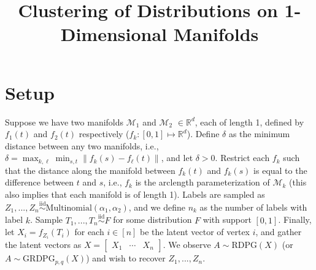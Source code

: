 \documentclass[
  11pt,
]{article}
\title{Clustering of Distributions on 1-Dimensional Manifolds}
\author{}
\date{\vspace{-2.5em}}
\begin{document}
\maketitle

\newcommand{\diag}{\mathrm{diag}}
\newcommand{\tr}{\mathrm{Tr}}
\newcommand{\blockdiag}{\mathrm{blockdiag}}
\newcommand{\indep}{\stackrel{\mathrm{ind}}{\sim}}
\newcommand{\iid}{\stackrel{\mathrm{iid}}{\sim}}
\newcommand{\Bernoulli}{\mathrm{Bernoulli}}
\newcommand{\Betadist}{\mathrm{Beta}}
\newcommand{\Uniform}{\mathrm{Uniform}}
\newcommand{\BG}{\mathrm{BernoulliGraph}}
\newcommand{\Categorical}{\mathrm{Categorical}}
\newcommand{\Multinomial}{\mathrm{Multinomial}}
\newcommand{\RDPG}{\mathrm{RDPG}}
\newcommand{\GRDPG}{\mathrm{GRDPG}}
\newtheorem{definition}{Definition}
\newtheorem{theorem}{Theorem}
\newtheorem{lemma}{Lemma}
\theoremstyle{remark}
\newtheorem*{remark}{Remark}
\theoremstyle{example}
\newtheorem*{example}{Example}
\newcommand{\dd}{\mathrm{d}}
\newcommand{\as}{\stackrel{\mathrm{a.s.}}{\to}}

\hypertarget{setup}{%
\section{Setup}\label{setup}}

Suppose we have two manifolds \(\mathcal{M}_1\) and \(\mathcal{M}_2\)
\(\in \mathbb{R}^d\), each of length 1, defined by \(f_1(t)\) and
\(f_2(t)\) respectively (\(f_k : [0, 1] \mapsto \mathbb{R}^d\)). Define
\(\delta\) as the minimum distance between any two manifolds, i.e.,
\(\delta = \max_{k, \ell} \min_{s, t} \|f_k(s) - f_\ell(t)\|\), and let
\(\delta > 0\). Restrict each \(f_k\) such that the distance along the
manifold between \(f_k(t)\) and \(f_k(s)\) is equal to the difference
between \(t\) and \(s\), i.e., \(f_k\) is the arclength parameterization
of \(\mathcal{M}_k\) (this also implies that each manifold is of length
1). Labels are sampled as
\(Z_1, ..., Z_n \stackrel{\mathrm{iid}}{\sim}\mathrm{Multinomial}(\alpha_1, \alpha_2)\),
and we define \(n_k\) as the number of labels with label \(k\). Sample
\(T_1, ..., T_n \stackrel{\mathrm{iid}}{\sim}F\) for some distribution
\(F\) with support \([0, 1]\). Finally, let \(X_i = f_{Z_i}(T_i)\) for
each \(i \in [n]\) be the latent vector of vertex \(i\), and gather the
latent vectors as
\(X = \begin{bmatrix} X_1 & \cdots & X_n \end{bmatrix}\). We observe
\(A \sim \mathrm{RDPG}(X)\) (or \(A \sim \mathrm{GRDPG}_{p,q}(X)\)) and
wish to recover \(Z_1, ..., Z_n\).
\end{document}
